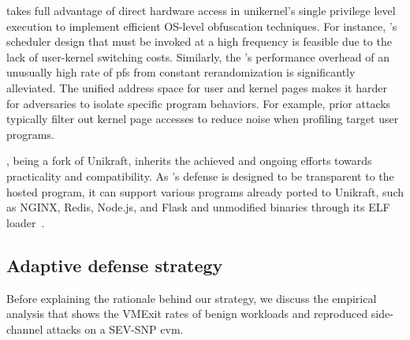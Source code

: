 \thename takes full advantage of direct hardware access in unikernel's single privilege level execution to implement efficient OS-level obfuscation techniques.
For instance, \thename's scheduler design that must be invoked at a high frequency is feasible due to the lack of user-kernel switching costs.
Similarly, the \thename's performance overhead of an unusually high rate of \glspl{pf} from constant rerandomization is significantly alleviated.
The unified address space for user and kernel pages makes it harder for adversaries to isolate specific program behaviors.
For example, prior attacks~\cite{wilke2020sevurity,heckler,wesee} typically filter out kernel page accesses to reduce noise when profiling target user programs.


\thename, being a fork of Unikraft, inherits the achieved and ongoing efforts towards practicality and compatibility.
As \thename's defense is designed to be transparent to the hosted program, it can support various programs already ported to Unikraft, such as NGINX, Redis, Node.js, and Flask and unmodified binaries through its ELF loader~\cite{unikraft-dynamic-app}.


\subsection{Adaptive defense strategy}
\label{sec:overview:strategy}
\label{subsec:adversary-analysis}


Before explaining the rationale behind our strategy, we discuss the empirical analysis that shows the VMExit rates of benign workloads and reproduced side-channel attacks on a SEV-SNP \gls{cvm}.


